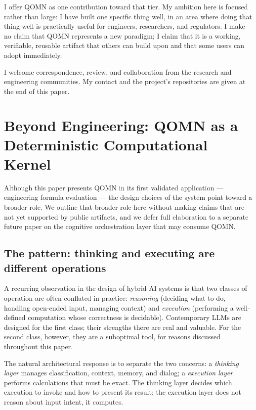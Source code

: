 \documentclass[11pt,a4paper]{article}
\begin{document}
\begin{enumerate}[leftmargin=*]
I offer QOMN as one contribution toward that tier. My ambition here is focused rather than large: I have built one specific thing well, in an area where doing that thing well is practically useful for engineers, researchers, and regulators. I make no claim that QOMN represents a new paradigm; I claim that it is a working, verifiable, reusable artifact that others can build upon and that some users can adopt immediately.

I welcome correspondence, review, and collaboration from the research and engineering communities. My contact and the project's repositories are given at the end of this paper.

\section{Beyond Engineering: QOMN as a Deterministic Computational Kernel}
\label{sec:beyond}

Although this paper presents QOMN in its first validated application --- engineering formula evaluation --- the design choices of the system point toward a broader role. We outline that broader role here without making claims that are not yet supported by public artifacts, and we defer full elaboration to a separate future paper on the cognitive orchestration layer that may consume QOMN.

\subsection{The pattern: thinking and executing are different operations}

A recurring observation in the design of hybrid AI systems is that two classes of operation are often conflated in practice: \emph{reasoning} (deciding what to do, handling open-ended input, managing context) and \emph{execution} (performing a well-defined computation whose correctness is decidable). Contemporary LLMs are designed for the first class; their strengths there are real and valuable. For the second class, however, they are a suboptimal tool, for reasons discussed throughout this paper.

The natural architectural response is to separate the two concerns: a \emph{thinking layer} manages classification, context, memory, and dialog; a \emph{execution layer} performs calculations that must be exact. The thinking layer decides which execution to invoke and how to present its result; the execution layer does not reason about input intent, it computes.


\end{enumerate}
\end{document}
